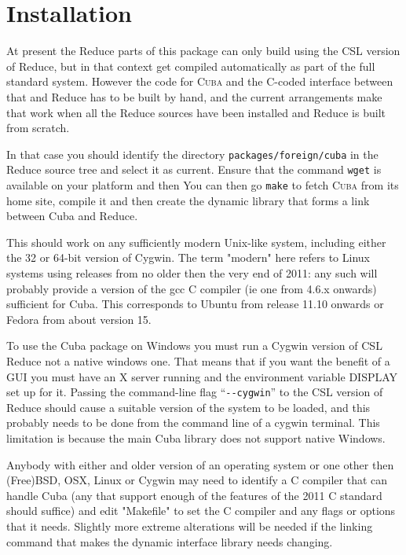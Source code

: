 \documentclass[11pt]{article}
\newcommand{\Cuba}{\textsc{Cuba}}
\begin{document}
\section{Installation}

At present the Reduce parts of this package can only build using the CSL
version of Reduce, but in that context get compiled automatically as part
of the full standard system. However the code for {\Cuba} and the C-coded
interface between that and Reduce has to be built by hand, and the current
arrangements make that work when all the Reduce sources have been installed
and Reduce is built from scratch.

In that case you should identify the directory \verb+packages/foreign/cuba+
in the Reduce source tree and select it as current. Ensure that the command
\verb+wget+ is available on your platform and then You can then go
\verb+make+ to fetch {\Cuba} from its home site, compile it and then create
the dynamic library that forms a link between Cuba and Reduce.

This should work on any sufficiently modern Unix-like system, including
either the 32 or 64-bit version of Cygwin. The term "modern" here refers
to Linux systems using releases from no older then the very end of 2011:
any such will probably provide a version of the gcc C compiler (ie one
from 4.6.x onwards) sufficient for Cuba. This corresponds to Ubuntu from
release 11.10 onwards or Fedora from about version 15.

To use the Cuba package on Windows you must run a Cygwin version of CSL
Reduce not a native windows one. That means that if you want the benefit of
a GUI you must have an X server running and the environment variable
DISPLAY set up for it. Passing the command-line flag ``\verb+--cygwin+'' to
the CSL version of Reduce should cause a suitable version of the system to
be loaded, and this probably needs to be done from the command line of
a cygwin terminal. This limitation is because the main Cuba library does not
support native Windows.

Anybody with either and older version of an operating system or one other
then (Free)BSD, OSX, Linux or Cygwin may need to identify a C compiler
that can handle Cuba (any that support enough of the features of the 2011
C standard should suffice) and edit "Makefile" to set the C compiler and
any flags or options that it needs. Slightly more extreme alterations will
be needed if the linking command that makes the dynamic interface library
needs changing.
\end{document}
